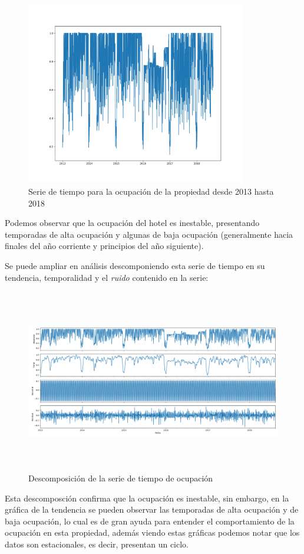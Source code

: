 \begin{figure}[H]
  \centering
      \includegraphics[width=\maxwidth,height=8cm]{figures/TsOcc.png}    
  \caption{Serie de tiempo para la ocupación de la propiedad desde 2013 hasta 2018}
\end{figure}

Podemos observar que la ocupación del hotel es inestable, presentando temporadas de alta ocupación y algunas de baja ocupación (generalmente hacia finales del año corriente y principios del año siguiente).

Se puede ampliar en análisis descomponiendo esta serie de tiempo en su tendencia, temporalidad y el \emph{ruido} contenido en la serie:

\begin{figure}[H]
  \centering
      \includegraphics[width=\maxwidth,height=8cm]{figures/Decomp.png}    
  \caption{Descomposición de la serie de tiempo de ocupación}
\end{figure}

Esta descomposción confirma que la ocupación es inestable, sin embargo, en la gráfica de la tendencia se pueden observar las temporadas de alta ocupación y de baja ocupación, lo cual es de gran ayuda para entender el comportamiento de la ocupación en esta propiedad, además viendo estas gráficas podemos notar que los datos son estacionales, es decir, presentan un ciclo.

